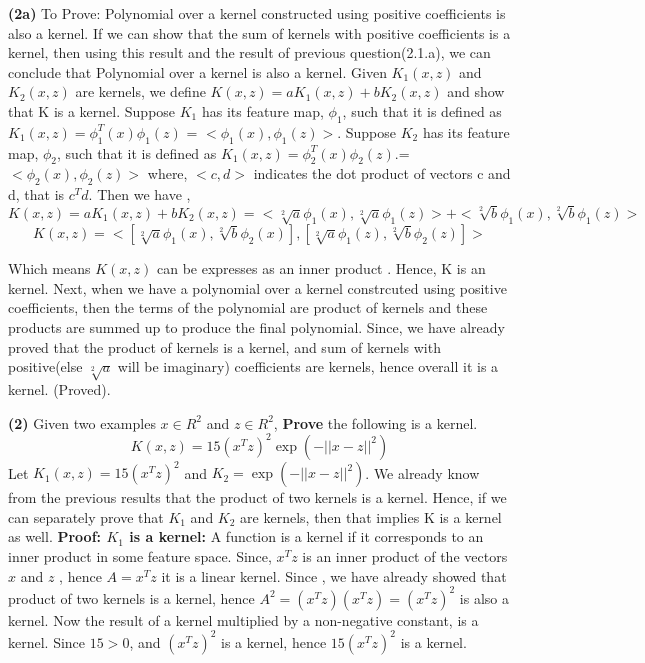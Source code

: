 \documentclass{article}
\renewcommand\part[1]{\vspace{.10in}\textbf{(#1)}}
\begin{document}
    \part{2a} To Prove: Polynomial over a kernel constructed using positive coefficients is also a kernel.\newline
    If we can show that the sum of kernels with positive coefficients is a kernel, then using this result and the result of previous question(2.1.a), we can conclude that Polynomial over a kernel is also a kernel. \newline
    Given $K_1(x,z)$ and $K_2(x,z)$ are kernels, we define $K(x,z) = a K_1(x,z) + b K_2(x,z)$ and show that K is a kernel. \newline
    Suppose $K_1$ has its feature map, $\phi_1$, such that it is defined as $K_1(x,z) = \phi_1^T(x)\phi_1(z)$ = $<\phi_1(x), \phi_1(z)>$.
    Suppose $K_2$ has its feature map, $\phi_2$, such that it is defined as $K_1(x,z) = \phi_2^T(x)\phi_2(z)$.=$<\phi_2(x), \phi_2(z)>$  \newline
    where, $<c,d>$ indicates the dot product of vectors c and d, that is $c^Td$. \newline
    Then we have , \newline
    \[K(x,z) = a K_1(x,z) + b K_2(x,z) = <\sqrt[2]{a}\phi_1(x), \sqrt[2]{a}\phi_1(z)> + <\sqrt[2]{b}\phi_1(x), \sqrt[2]{b}\phi_1(z)>\]
    \[K(x,z) = <[\sqrt[2]{a}\phi_1(x), \sqrt[2]{b}\phi_2(x)], [\sqrt[2]{a}\phi_1(z), \sqrt[2]{b}\phi_2(z)]>\]

    Which means $K(x,z)$ can be expresses as an inner product . Hence, K is an kernel.
    Next, when we have a polynomial over a kernel constrcuted using positive coefficients, then the terms of the polynomial are product of kernels and these products are summed up to produce the final polynomial. Since, we have already proved that the product of kernels is a kernel, and sum of kernels with positive(else $\sqrt[2]{a}$ will be imaginary) coefficients are kernels, hence overall it is a kernel. (Proved). \newline

    \part{2} Given two examples $x \in R^2$ and $z \in R^2$, \textbf {Prove} the following is a kernel.
    \[K(x,z) = 15(x^Tz)^2 \exp(-||x-z||^2)\]
    Let $K_1(x,z) = 15(x^Tz)^2$ and $K_2 = \exp(-||x-z||^2)$. We already know from the previous results that the product of two kernels is a kernel. Hence, if we can separately prove that $K_1$ and $K_2$ are kernels, then that implies K is a kernel as well. \newline
    \textbf {Proof: $K_1$ is a kernel: } A function is a kernel if it corresponds to an inner product in some feature space. Since, $x^Tz$ is an inner product of the vectors $x$ and $z$ , hence $A = x^Tz$ it is a linear kernel. Since , we have already showed that product of two kernels is a kernel, hence $A^2 = (x^Tz)(x^Tz) = (x^Tz)^2$ is also a kernel. Now the result of a kernel multiplied by a non-negative constant, is a kernel. Since $15>0$, and $(x^Tz)^2$ is a kernel, hence $15(x^Tz)^2$ is a kernel. \newline
    
\end{document}
